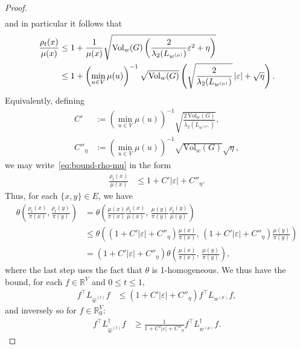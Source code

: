 \documentclass[11pt,a4paper]{article}
\newcommand{\Vol}{\mathrm{Vol}}
\begin{document}
\begin{proof}
\begin{align*}
        \end{align*}
    and in particular it follows that
        \begin{align}\label{eq:bound-rho-mu}
            \frac{\rho_t(x)}{\mu(x)} &\leq 1 + \frac{1}{\mu(x)}\sqrt{\Vol_w(G)\left(\frac{2}{\lambda_2(L_{w^{(\mu)}})}\varepsilon^2 + \eta\right)}\notag\\
            &\leq 1 + \left(\min_{u\in V}\mu(u)\right)^{-1}\sqrt{\Vol_w(G)}\left(\sqrt{\frac{2}{\lambda_2(L_{w^{(\mu)}})}}\,|\varepsilon| + \sqrt{\eta}\right).
        \end{align}
    Equivalently, defining
        \begin{align*}
            C' &:= \left(\min_{u\in V}\mu(u)\right)^{-1}\sqrt{\frac{2\,\Vol_w(G)}{\lambda_2(L_{w^{(\mu)}})}},\\
            C''_{\eta} &:= \left(\min_{u\in V}\mu(u)\right)^{-1}\sqrt{\Vol_w(G)}\sqrt{\eta},
        \end{align*}
    we may write~\cref{eq:bound-rho-mu} in the form
        \begin{align*}
            \frac{\rho_t(x)}{\mu(x)} &\leq 1 + C' |\varepsilon| + C''_{\eta}.
        \end{align*}
    Thus, for each $\{x,y\}\in E$, we have
        \begin{align*}
            \theta\left(\frac{\rho_t(x)}{\pi(x)}, \frac{\rho_t(y)}{\pi(y)}\right)
            &= \theta\left(\frac{\mu(x)}{\pi(x)}\frac{\rho_t(x)}{\mu(x)},\,\frac{\mu(y)}{\pi(y)}\frac{\rho_t(y)}{\mu(y)}\right)\\
            &\leq \theta\left(\left(1+C'|\varepsilon|+C''_{\eta}\right)\frac{\mu(x)}{\pi(x)},\,\left(1+C'|\varepsilon|+C''_{\eta}\right)\frac{\mu(y)}{\pi(y)}\right)\\
            &= \left(1+C'|\varepsilon|+C''_{\eta}\right)\theta\left(\frac{\mu(x)}{\pi(x)},\,\frac{\mu(y)}{\pi(y)}\right),
        \end{align*}
    where the last step uses the fact that $\theta$ is 1-homogeneous. We thus have the bound, for each $f\in\mathbb{R}^{V}$ and $0\le t\le 1$,
        \begin{align*}
            f^\top L_{\widehat{w}^{(t)}} f &\leq \left(1 + C'|\varepsilon| + C''_{\eta}\right) f^\top L_{w^{(\mu)}} f,
        \end{align*} 
    and inversely so for $f\in\mathbb{R}^{V}_0$:
        \begin{align}\label{eq:bound-Z}
            f^\top L_{\widehat{w}^{(t)}}^{\dagger} f &\geq \frac{1}{1 + C'|\varepsilon| + C''_{\eta}} f^\top L_{w^{(\mu)}}^{\dagger} f.

\end{align}
\end{proof}
\end{document}
